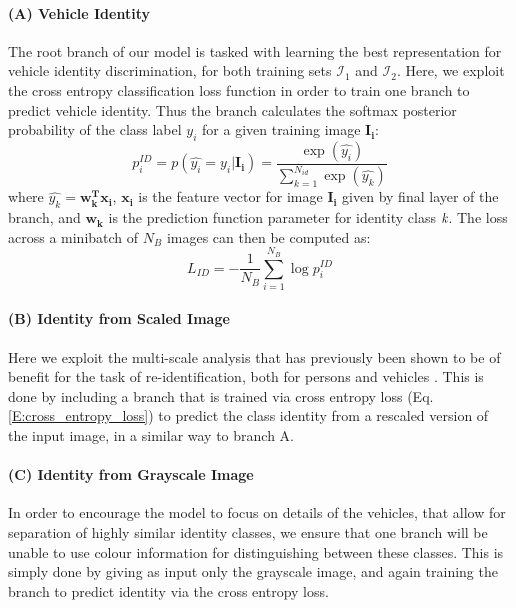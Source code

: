 \documentclass[10pt,twocolumn,letterpaper]{article}
\begin{document}
\paragraph{(A) Vehicle Identity}

The root branch of our model is tasked with learning the best representation for vehicle identity discrimination, for both training sets $\mathcal{I}_1$ and $\mathcal{I}_2$.
Here, we exploit the cross entropy classification loss function in order to train one branch to predict vehicle identity. Thus the branch calculates the softmax posterior probability of the class label $y_i$ for a given training image $\mathbf{I_i}$:
\begin{equation}
  p_i^{ID} = p(\hat{y_i} = y_i|\mathbf{I_i}) = \frac{\exp(\hat{y_i})}{\sum_{k=1}^{N_{id}}\exp(\hat{y_k})}
  \label{E:softmax_id}
\end{equation}
where $\hat{y_k} = \mathbf{w_k^Tx_i}$, $\mathbf{x_i}$ is the feature vector for image $\mathbf{I_i}$ given by final layer of the branch, and $\mathbf{w_k}$ is the prediction function parameter for identity class $\emph{k}$. The loss across a minibatch of $N_B$ images can then be computed as:
\begin{equation}
  L_{ID} = -\frac{1}{N_B} \sum_{i=1}^{N_B} \log{p_i^{ID}}
  \label{E:cross_entropy_loss}
\end{equation}

\paragraph{(B) Identity from Scaled Image}

Here we exploit the multi-scale analysis that has previously been shown to be of benefit for the task of re-identification, both for persons \cite{chen2017person} and vehicles \cite{kanaci2018vehicle}. This is done by including a branch that is trained via cross entropy loss (Eq. \ref{E:cross_entropy_loss}) to predict the class identity from a rescaled version of the input image, in a similar way to branch A.

\paragraph{(C) Identity from Grayscale Image}

In order to encourage the model to focus on details of the vehicles, that allow for separation of highly similar identity classes, we ensure that one branch will be unable to use colour information for distinguishing between these classes. This is simply done by giving as input only the grayscale image, and again training the branch to predict identity via the cross entropy loss.
\end{document}
